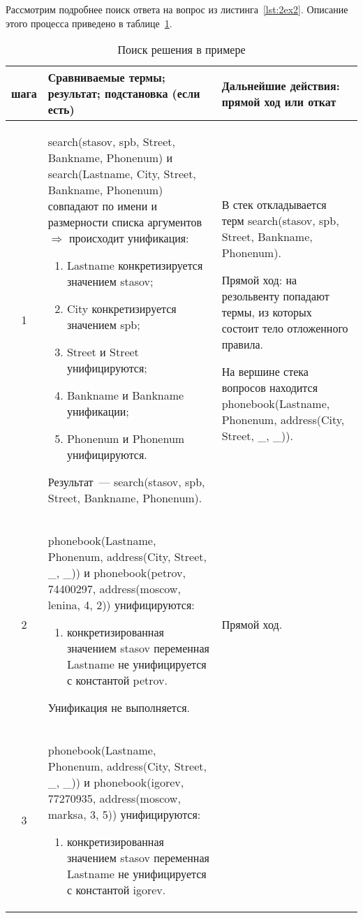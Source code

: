 Рассмотрим подробнее поиск ответа на вопрос из листинга~\ref{lst:2ex2}. Описание этого процесса приведено в таблице~\ref{tbl:ex3}.
\footnotesize
\begin{longtable}{|c|p{}|p{}|}
    \caption{Поиск решения в примере }\label{tbl:ex3} \\
    \hline
    \textnumero{} шага &
        Сравниваемые термы; результат; подстановка (если есть) &
        Дальнейшие действия: прямой ход или откат \\
    \hline
    1 &
    search(stasov, spb, Street, Bankname, Phonenum) и search(Lastname, City, Street, Bankname, Phonenum) совпадают по имени и размерности списка аргументов $\Rightarrow$ происходит унификация:
    \begin{enumerate}[label=\arabic*)]
        \item Lastname конкретизируется значением stasov;
        \item City конкретизируется значением spb;
        \item Street и  Street унифицируются;
        \item Bankname и Bankname унификации;
        \item Phonenum и Phonenum унифицируются.
    \end{enumerate}
    Результат~--- search(stasov, spb, Street, Bankname, Phonenum).
    &
    В стек откладывается терм search(stasov, spb, Street, Bankname, Phonenum).

    Прямой ход: на резольвенту попадают термы, из которых состоит тело отложенного правила.

    На вершине стека вопросов находится phonebook(Lastname, Phonenum, address(City, Street, \_, \_)).
    \\ \hline

    2 &
    phonebook(Lastname, Phonenum, address(City, Street, \_, \_)) и
    phonebook(petrov, 74400297,
              address(moscow,    lenina,       4,  2))
    унифицируются:
    \begin{enumerate}[label=\arabic*)]
        \item конкретизированная значением stasov переменная Lastname не унифицируется с константой petrov.
    \end{enumerate}

    Унификация не выполняется.
      &
    Прямой ход.
    \\ \hline

    3 &
    phonebook(Lastname, Phonenum, address(City, Street, \_, \_)) и
    phonebook(igorev, 77270935,
              address(moscow,    marksa,       3,  5))
    унифицируются:
    \begin{enumerate}[label=\arabic*)]
        \item конкретизированная значением stasov переменная Lastname не унифицируется с константой igorev.
    \end{enumerate}


\end{longtable}
